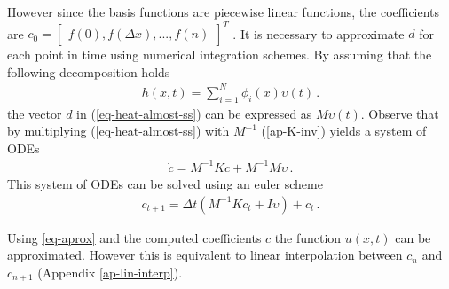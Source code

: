 However since the basis functions are piecewise linear functions, the coefficients are \(c_0 = \begin{bmatrix}
f(0), f(\Delta x), ..., f(n)
\end{bmatrix}^T\)
\cite{Gustafsson2011g}.
It is necessary to approximate \(d\) for each point in time using numerical integration schemes.
By assuming that the following decomposition holds
\begin{gather}
h(x, t) = \sum_{i = 1}^{N} \phi_i(x) \upsilon(t) \,.
\end{gather}
the vector \(d\) in (\ref{eq-heat-almost-ss}) can be expressed as \(M\upsilon(t)\).
Observe that by multiplying (\ref{eq-heat-almost-ss}) with \(M^{-1}\) (\ref{ap-K-inv}) yields a system of ODEs
\begin{gather}
\dot{c} = M^{-1}Kc + M^{-1}M\upsilon \,. \label{almost-almost-ss}
\end{gather}
This system of ODEs can be solved using an euler scheme
\begin{gather}
c_{t+1} = \Delta t (M^{-1}Kc_{t} + I\upsilon) + c_{t} \,. \label{fem-euler}
\end{gather}

Using \ref{eq-aprox} and the computed coefficients \(c\) the function \(u(x,t)\) can be approximated.
However this is equivalent to linear interpolation between \(c_{n}\) and \(c_{n+1}\) (Appendix \ref{ap-lin-interp}).
